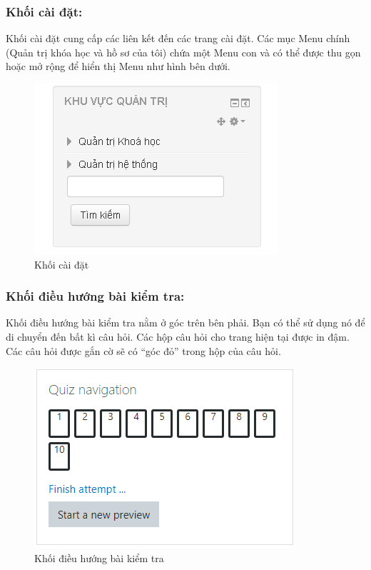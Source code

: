 \subsubsection{Khối cài đặt:}
Khối cài đặt cung cấp các liên kết đến các trang cài đặt. Các mục Menu chính (Quản trị khóa học và hồ sơ của tôi) chứa một Menu con và có thể được thu gọn hoặc mở rộng để hiển thị Menu như hình bên dưới.
\begin{center}
	\begin{figure}[htp]
		\begin{center}
			\includegraphics[scale=1]{img/khoicaidat}
		\end{center}
		\caption{Khối cài đặt}
		\label{refhinh6}
	\end{figure}
\end{center}

\subsubsection{Khối điều hướng bài kiểm tra:}
Khối điều hướng bài kiểm tra nằm ở góc trên bên phải. Bạn có thể sử dụng nó để di chuyển đến bất kì câu hỏi. Các hộp câu hỏi cho trang hiện tại được in đậm. Các câu hỏi được gắn cờ sẽ có “góc đỏ” trong hộp của câu hỏi.
\begin{center}
	\begin{figure}[htp]
		\begin{center}
			\includegraphics[scale=1]{img/khoibaikiemtra}
		\end{center}
		\caption{Khối điều hướng bài kiểm tra}
		\label{refhinh7}
	\end{figure}
\end{center}

